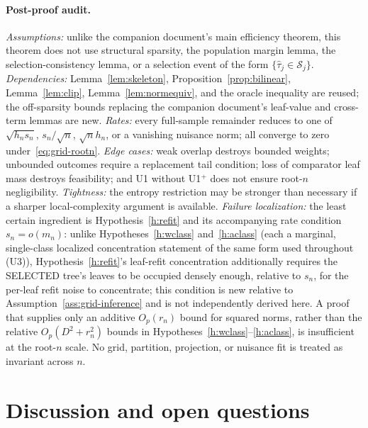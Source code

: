 \documentclass[11pt]{article}
\theoremstyle{plain}
\theoremstyle{definition}
\theoremstyle{remark}
\newcommand{\cS}{\mathcal{S}}
\begin{document}
\paragraph{Post-proof audit.}
\emph{Assumptions:} unlike the companion document's main efficiency
theorem, this theorem does not use structural sparsity, the population
margin lemma, the selection-consistency lemma, or a selection event of the
form $\{\widehat\tau_j\in\cS_j\}$.
\emph{Dependencies:} Lemma~\ref{lem:skeleton}, Proposition~\ref{prop:bilinear},
Lemma~\ref{lem:clip}, Lemma~\ref{lem:normequiv}, and the oracle inequality
are reused; the off-sparsity bounds replacing the companion document's
leaf-value and cross-term lemmas are new.
\emph{Rates:} every full-sample remainder reduces to one of $\sqrt{h_ns_n}$,
$s_n/\sqrt n$, $\sqrt n h_n$, or a vanishing nuisance norm; all converge to
zero under~\eqref{eq:grid-rootn}.
\emph{Edge cases:} weak overlap destroys bounded weights; unbounded
outcomes require a replacement tail condition; loss of comparator leaf mass
destroys feasibility; and U1 without U1$^+$ does not ensure root-$n$
negligibility.
\emph{Tightness:} the entropy restriction may be stronger than necessary if
a sharper local-complexity argument is available.
\emph{Failure localization:} the least certain ingredient is
Hypothesis~\ref{h:refit} and its accompanying rate condition $s_n=o(m_n)$:
unlike Hypotheses~\ref{h:wclass} and~\ref{h:aclass} (each a marginal,
single-class localized concentration statement of the same form used
throughout (U3)), Hypothesis~\ref{h:refit}'s leaf-refit concentration
additionally requires the SELECTED tree's leaves to be occupied densely
enough, relative to $s_n$, for the per-leaf refit noise to concentrate; this
condition is new relative to Assumption~\ref{ass:grid-inference} and is not
independently derived here. A proof that supplies only an additive
$O_p(r_n)$ bound for squared norms, rather than the relative
$O_p(D^2+r_n^2)$ bounds in Hypotheses~\ref{h:wclass}--\ref{h:aclass}, is
insufficient at the root-$n$ scale. No grid, partition, projection, or
nuisance fit is treated as invariant across $n$.

\section{Discussion and open questions}\label{sec:discussion}
\end{document}
